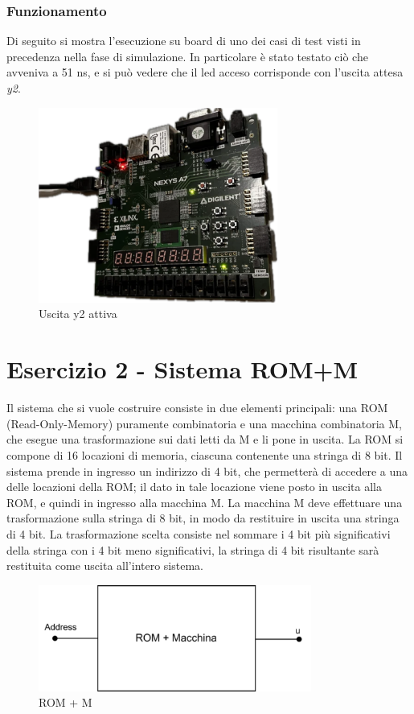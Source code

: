 \subsection{Funzionamento}
Di seguito si mostra l'esecuzione su board di uno dei casi di test visti in precedenza nella fase di simulazione. In particolare è stato testato ciò che avveniva a 51 ns, e si può vedere che il led acceso corrisponde con l'uscita attesa \textit{y2}.
\begin{figure}[H]
	\centering
	\includegraphics[width=0.7\textwidth]{img/TestRI}
	\caption{Uscita y2 attiva}
	\label{testRI} 
\end{figure}


\chapter{Esercizio 2 - Sistema ROM+M}
Il sistema che si vuole costruire consiste in due elementi principali: una ROM (Read-Only-Memory) puramente combinatoria e una macchina combinatoria M, che esegue una trasformazione sui dati letti da M e li pone in uscita. La ROM si compone di 16 locazioni di memoria, ciascuna contenente una stringa di 8 bit. Il sistema prende in ingresso un indirizzo di 4 bit, che permetterà di accedere a una delle locazioni della ROM; il dato in tale locazione viene posto in uscita alla ROM, e quindi in ingresso alla macchina M. La macchina M deve effettuare una trasformazione sulla stringa di 8 bit, in modo da restituire in uscita una stringa di 4 bit. La trasformazione scelta consiste nel sommare i 4 bit più significativi della stringa con i 4 bit meno significativi, la stringa di 4 bit risultante sarà restituita come uscita all'intero sistema.
\begin{figure}[H]
	\centering
	\includegraphics[width=0.8\textwidth]{img/rom_M_black_box}
	\caption{ROM + M}
	\label{Rom_M} 
\end{figure}
